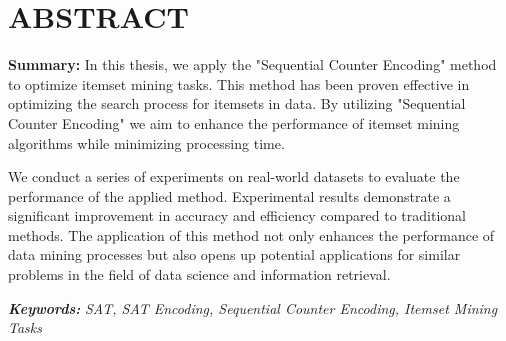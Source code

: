 \chapter*{ABSTRACT}
\fontsize{13}{15}\selectfont

\textbf{Summary:} In this thesis, we apply the "Sequential Counter Encoding" method to optimize itemset mining tasks. This method has been proven effective in optimizing the search process for itemsets in data. By utilizing "Sequential Counter Encoding" we aim to enhance the performance of itemset mining algorithms while minimizing processing time.

We conduct a series of experiments on real-world datasets to evaluate the performance of the applied method. Experimental results demonstrate a significant improvement in accuracy and efficiency compared to traditional methods. The application of this method not only enhances the performance of data mining processes but also opens up potential applications for similar problems in the field of data science and information retrieval.

\textbf{\textit{Keywords: }} \textit{SAT, SAT Encoding, Sequential Counter Encoding, Itemset Mining Tasks}